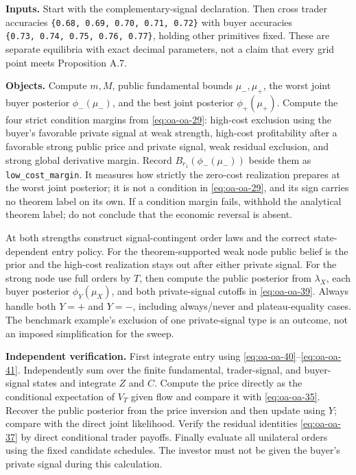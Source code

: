 \documentclass[
  11pt,
]{article}
\begin{document}
\textbf{Inputs.} Start with the complementary-signal declaration. Then
cross trader accuracies \texttt{\{0.68,\ 0.69,\ 0.70,\ 0.71,\ 0.72\}}
with buyer accuracies \texttt{\{0.73,\ 0.74,\ 0.75,\ 0.76,\ 0.77\}},
holding other primitives fixed. These are separate equilibria with exact
decimal parameters, not a claim that every grid point meets Proposition
A.7.

\textbf{Objects.} Compute \(m,M\), public fundamental bounds
\(\mu_-,\mu_+\), the worst joint buyer posterior \(\phi_-(\mu_-)\), and
the best joint posterior \(\phi_+(\mu_+)\). Compute the four strict
condition margins from \eqref{eq:oa-oa-29}: high-cost
exclusion using the buyer's favorable private signal at weak strength,
high-cost profitability after a favorable strong public price and
private signal, weak residual exclusion, and strong global derivative
margin. Record \(B_{r_1}(\phi_-(\mu_-))\) beside them as
\texttt{low\_cost\_margin}. It measures how strictly the zero-cost realization
prepares at the worst joint posterior; it is not a condition in
\eqref{eq:oa-oa-29}, and its sign carries no theorem label on its own.
If a condition margin fails, withhold the analytical theorem label; do not
conclude that the economic reversal is absent.

At both strengths construct signal-contingent order laws and the correct
state-dependent entry policy. For the theorem-supported weak node public
belief is the prior and the high-cost realization stays out after either
private signal.
For the strong node use full orders by \(T\), then compute the public
posterior from \(\lambda_X\), each buyer posterior \(\phi_Y(\mu_X)\),
and both private-signal cutoffs in \eqref{eq:oa-oa-39}. Always handle
both \(Y=+\) and \(Y=-\), including always/never and plateau-equality
cases. The benchmark example's exclusion of one private-signal type is
an outcome, not an imposed simplification for the sweep.

\textbf{Independent verification.} First integrate entry using
\eqref{eq:oa-oa-40}--\eqref{eq:oa-oa-41}. Independently sum over the
finite fundamental, trader-signal, and buyer-signal states and integrate
\(Z\) and \(C\). Compute the price directly as the conditional
expectation of \(V_T\) given flow and compare it with
\eqref{eq:oa-oa-35}. Recover the public posterior from the price
inversion and then update using \(Y\); compare with the direct joint
likelihood. Verify the residual identities \eqref{eq:oa-oa-37} by direct
conditional trader payoffs. Finally evaluate all unilateral orders using
the fixed candidate schedules. The investor must not be given the
buyer's private signal during this calculation.
\end{document}
